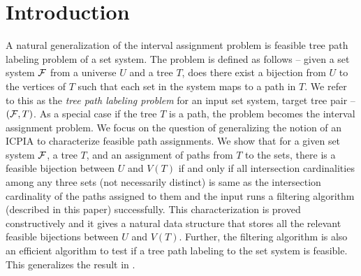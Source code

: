 \documentclass[MS]             %
              {iitmdiss_as}    %
\begin{document}
\section{Introduction} 
A natural generalization of the interval
assignment problem is feasible tree path labeling problem of a set
system. The problem is defined as follows -- given a set system ${\cal F}$
from a universe $U$ and a tree $T$, does there exist a bijection from
$U$ to the vertices of $T$ such that each set in the system maps to a
path in $T$.  We refer to this as the {\em tree path labeling problem}
for an input set system, target tree pair -- $({\cal F},T)$. As a special
case if the tree $T$ is a path, the problem becomes the interval
assignment problem.  We focus on the question of generalizing the
notion of an ICPIA \cite{nsnrs09} to characterize feasible path
assignments.  We show that for a given set system ${\cal F}$, a tree $T$,
and an assignment of paths from $T$ to the sets, there is a feasible
bijection between $U$ and $V(T)$ if and only if all intersection
cardinalities among any three sets (not necessarily distinct) is same
as the intersection cardinality of the paths assigned to them and the
input runs a filtering algorithm (described in this paper)
successfully.  This characterization is proved constructively and it
gives a natural data structure that stores all the relevant feasible
bijections between $U$ and $V(T)$.  Further, the filtering algorithm
is also an efficient algorithm to test if a tree path labeling to the
set system is feasible.  This generalizes the result in
\cite{nsnrs09}.
\end{document}
